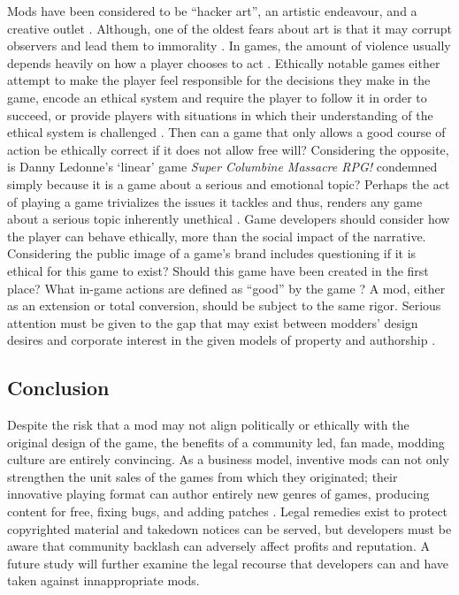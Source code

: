 \documentclass{scrartcl}
\begin{document}
Mods have been considered to be ``hacker art'', an artistic endeavour, and a creative outlet \cite{sotamaa2010game}. Although, one of the oldest fears about art is that it may corrupt observers and lead them to immorality \cite{schulzke2009moral}. In games, the amount of violence usually depends heavily on how a player chooses to act \cite{schulzke2010defending}. Ethically notable games either attempt to make the player feel responsible for the decisions they make in the game, encode an ethical system and require the player to follow it in order to succeed, or provide players with situations in which their understanding of the ethical system is challenged \cite{zagal2009ethically}. Then can a game that only allows a good course of action be ethically correct if it does not allow free will? Considering the opposite, is Danny Ledonne's `linear' game \textit{Super Columbine Massacre RPG!} condemned simply because it is a game about a serious and emotional topic? Perhaps the act of playing a game trivializes the issues it tackles and thus, renders any game about a serious topic inherently unethical \cite{zagal2009ethically}. Game developers should consider how the player can behave ethically, more than the social impact of the narrative. Considering the public image of a game's brand includes questioning if it is ethical for this game to exist? Should this game have been created in the first place? What in-game actions are defined as ``good'' by the game \cite{zagal2009ethically}? A mod, either as an extension or total conversion, should be subject to the same rigor. Serious attention must be given to the gap that may exist between modders' design desires and corporate interest in the given models of property and authorship \cite{taylor2002whose}.

\subsection*{Conclusion}

Despite the risk that a mod may not align politically or ethically with the original design of the game, the benefits of a community led, fan made, modding culture are entirely convincing. As a business model, inventive mods can not only strengthen the unit sales of the games from which they originated; their innovative playing format can author entirely new genres of games, producing content for free, fixing bugs, and adding patches \cite{hong2014becoming}.  Legal remedies exist to protect copyrighted material \cite{copyright1988} \cite{trademarks1994} and takedown notices can be served, but developers must be aware that community backlash can adversely affect profits and reputation. A future study will further examine the legal recourse that developers can and have taken against innappropriate mods.



\end{document}
